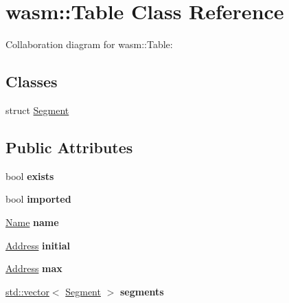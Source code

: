 \hypertarget{classwasm_1_1_table}{}\section{wasm\+:\+:Table Class Reference}
\label{classwasm_1_1_table}


Collaboration diagram for wasm\+:\+:Table\+:
\subsection*{Classes}
\begin{DoxyCompactItemize}
\item 
struct \mbox{\hyperlink{structwasm_1_1_table_1_1_segment}{Segment}}
\end{DoxyCompactItemize}
\subsection*{Public Attributes}
\begin{DoxyCompactItemize}
\item 
\mbox{\label{classwasm_1_1_table_a368fcdfee91529279658325b6d2b0086}} 
bool {\bfseries exists}
\item 
\mbox{\label{classwasm_1_1_table_a634c08676a39944e94711d5b74651e6a}} 
bool {\bfseries imported}
\item 
\mbox{\label{classwasm_1_1_table_af00e8720c5b030e00043333a4081eae9}} 
\mbox{\hyperlink{structwasm_1_1_name}{Name}} {\bfseries name}
\item 
\mbox{\label{classwasm_1_1_table_aac6b6d6017c97d8c23123ae6ca513614}} 
\mbox{\hyperlink{structwasm_1_1_address}{Address}} {\bfseries initial}
\item 
\mbox{\label{classwasm_1_1_table_a5aaa2930e3c0b303c11ef41d6a066066}} 
\mbox{\hyperlink{structwasm_1_1_address}{Address}} {\bfseries max}
\item 
\mbox{\label{classwasm_1_1_table_a7c14416a02201a57538755ee1bd9a3a2}} 
\mbox{\hyperlink{classstd_1_1vector}{std\+::vector}}$<$ \mbox{\hyperlink{structwasm_1_1_table_1_1_segment}{Segment}} $>$ {\bfseries segments}
\end{DoxyCompactItemize}
